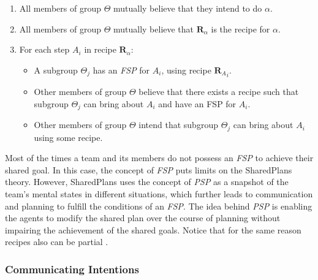 \documentclass[11pt]{article}
\begin{document}
\begin{enumerate}
  \item All members of group $\Theta$ mutually believe that they intend to do
  $\alpha$.
  \item All members of group $\Theta$ mutually believe that
  \textit{$\textbf{R}_\alpha$} is the recipe for $\alpha$.
  \item For each step \textit{$A_i$} in recipe \textit{$\textbf{R}_\alpha$}:
  \begin{itemize}
    \item A subgroup $\Theta_j$ has an \textit{FSP} for \textit{$A_i$}, using
    recipe \textit{${\textbf{R}_A}_i$}.
    \item Other members of group $\Theta$ believe that there exists a recipe
    such that subgroup $\Theta_j$ can bring about \textit{$A_i$} and have an FSP
    for \textit{$A_i$}.
    \item Other members of group $\Theta$ intend that subgroup $\Theta_j$ can
    bring about \textit{$A_i$} using some recipe.
  \end{itemize}
\end{enumerate}

Most of the times a team and its members do not possess an \textit{FSP} to
achieve their shared goal. In this case, the concept of \textit{FSP} puts limits
on the SharedPlans theory. However, SharedPlans uses the concept of \textit{PSP}
as a snapshot of the team's mental states in different situations, which further
leads to communication and planning to fulfill the conditions of an
\textit{FSP}. The idea behind \textit{PSP} is enabling the agents to modify the
shared plan over the course of planning without impairing the achievement of the
shared goals. Notice that for the same reason recipes also can be partial
\cite{grosz:collaboration, grosz:plans-discourse}.

\subsubsection{Communicating Intentions}
\end{document}
